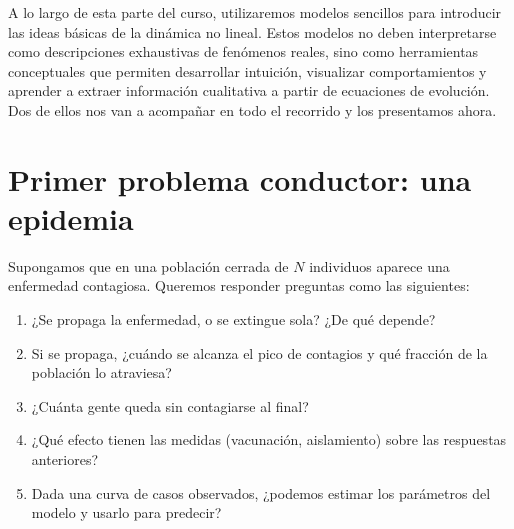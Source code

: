 \documentclass[12pt, a4paper]{amsbook}
\theoremstyle{remark}
\theoremstyle{definition}
\numberwithin{section}{chapter}
\numberwithin{subsection}{section}
\numberwithin{equation}{section}
\numberwithin{figure}{chapter}
\begin{document}
A lo largo de esta parte del curso, utilizaremos modelos sencillos para introducir las ideas básicas de la dinámica no lineal. Estos modelos no deben interpretarse como descripciones exhaustivas de fenómenos reales, sino como herramientas conceptuales que permiten desarrollar intuición, visualizar comportamientos y aprender a extraer información cualitativa a partir de ecuaciones de evolución. Dos de ellos nos van a acompañar en todo el recorrido y los presentamos ahora.

\section{Primer problema conductor: una epidemia}\label{sec:conductor-SIR}

Supongamos que en una población cerrada de $N$ individuos aparece una enfermedad contagiosa. Queremos responder preguntas como las siguientes:
\begin{enumerate}
\item ¿Se propaga la enfermedad, o se extingue sola? ¿De qué depende?
\item Si se propaga, ¿cuándo se alcanza el pico de contagios y qué fracción de la población lo atraviesa?
\item ¿Cuánta gente queda sin contagiarse al final?
\item ¿Qué efecto tienen las medidas (vacunación, aislamiento) sobre las respuestas anteriores?
\item Dada una curva de casos observados, ¿podemos estimar los parámetros del modelo y usarlo para predecir?
\end{enumerate}
\end{document}
